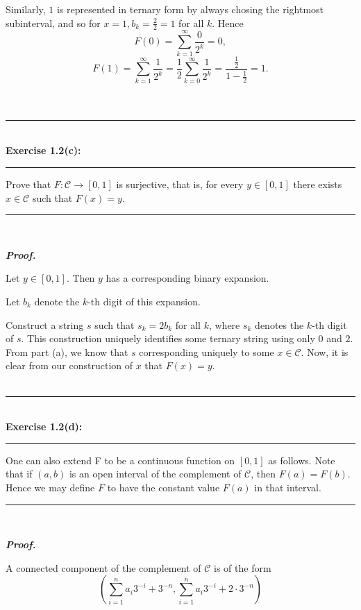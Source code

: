 \documentclass[a4paper,11pt]{article}
\begin{document}
Similarly, $1$ is represented in ternary form by always chosing the rightmost subinterval, and so for $x = 1, b_k = \frac{2}{2} = 1$ for all $k$. Hence
	$$F(0)
	= \overset{\infty}{\underset{k = 1}{\sum}} \frac{0}{2^k}
	= 0,$$
	$$F(1) = \overset{\infty}{\underset{k = 1}{\sum}} \frac{1}{2^k}
	= \frac{1}{2} \overset{\infty}{\underset{k = 0}{\sum}} \frac{1}{2^k}
	= \frac{\frac{1}{2}}{1 - \frac{1}{2}}
	= 1.$$\\\\


\begin{flushleft}
	\rule[-0.5ex]{17cm}{2pt}\\
		\textbf{Exercise 1.2(c):}\\
	\rule[1.5ex]{17cm}{0.5pt}
		Prove that $F: \mathcal{C} \to [0,1]$ is surjective, that is, for every $y \in [0,1]$ there exists $x \in \mathcal{C}$ such that $F(x) = y$.
	\rule[1.0ex]{17cm}{0.5pt}\
\end{flushleft}

\textbf{\textit{Proof.}}

Let $y \in [0,1]$. Then $y$ has a corresponding binary expansion.

Let $b_k$ denote the $k$-th digit of this expansion.

Construct a string $s$ such that $s_k = 2b_k$ for all $k$, where $s_k$ denotes the $k$-th digit of $s$.  This construction uniquely identifies some ternary string using only $0$ and $2$. From part (a), we know that $s$ corresponding uniquely to some $x \in \mathcal{C}$. Now, it is clear from our construction of $x$ that $F(x) = y$.\\\\

\begin{flushleft}
	\rule[-0.5ex]{17cm}{2pt}\\
		\textbf{Exercise 1.2(d):}\\
	\rule[1.5ex]{17cm}{0.5pt}
		One can also extend F to be a continuous function on $[0, 1]$ as follows. Note that if $(a, b)$ is an open interval of the complement of $\mathcal{C}$, then $F(a) = F(b)$. Hence we may define $F$ to have the constant value $F(a)$ in that interval.
	\rule[1.0ex]{17cm}{0.5pt}\
\end{flushleft}

\textbf{\textit{Proof.}}

A connected component of the complement of $\mathcal{C}$ is of the form
	$$\left( \overset{n}{\underset{i = 1}{\sum}} a_i 3^{-i} + 3^{-n}, \overset{n}{\underset{i = 1}{\sum}} a_i 3^{-i} + 2 \cdot 3^{-n}  \right)$$
\end{document}
